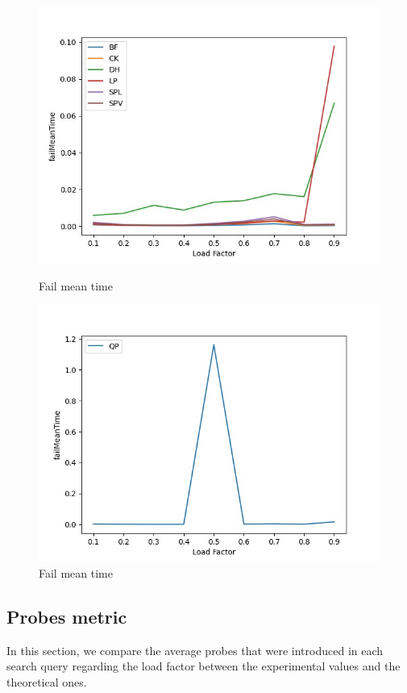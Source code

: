 \documentclass{article}
\begin{document}
        \begin{figure}[H]
          \includegraphics[width=\linewidth]{images/loadFactor_vs_failMeanTime.jpeg}
          \caption{Fail mean time}\label{fig:plot2}
        \endminipage\hfill
          \includegraphics[width=\linewidth]{images/loadFactor_vs_failMeanTimeQP.jpeg}
          \caption{Fail mean time}\label{fig:plot3}
        \endminipage
        \end{figure}
    
    
    \subsection*{Probes metric}
    In this section, we compare the average probes that were introduced in each search query regarding the load factor between the experimental values and the theoretical ones.
    
\end{document}
